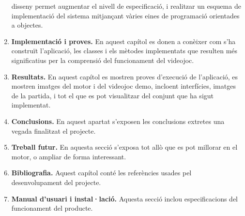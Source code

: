 \begin{enumerate}
disseny permet augmentar el nivell de especificació, i realitzar un esquema
de implementació del sistema mitjançant vàries eines de programació orientades
a objectes.
\item \textbf{Implementació i proves.} En aquest capítol es donen a conèixer com s’ha
construït l’aplicació, les classes i els mètodes implementats que resulten
més significatius per la comprensió del funcionament del videojoc.
\item \textbf{Resultats.} En aquest capítol es mostren proves d’execució de l’aplicació,
es mostren imatges del motor i del videojoc demo, incloent interfícies, imatges de la partida,
i tot el que es pot visualitzar del conjunt que ha sigut implementat.
\item \textbf{Conclusions.} En aquest apartat s’exposen les conclusions extretes una
vegada finalitzat el projecte.
\item \textbf{Treball futur.} En aquesta secció s’exposa tot allò que es pot millorar en
el motor, o ampliar de forma interessant.
\item \textbf{Bibliografia.} Aquest capítol conté les referències usades pel desenvolupament
del projecte.
\item \textbf{Manual d’usuari i instal·lació.} Aquesta secció inclou especificacions
del funcionament del producte.
\end{enumerate}
